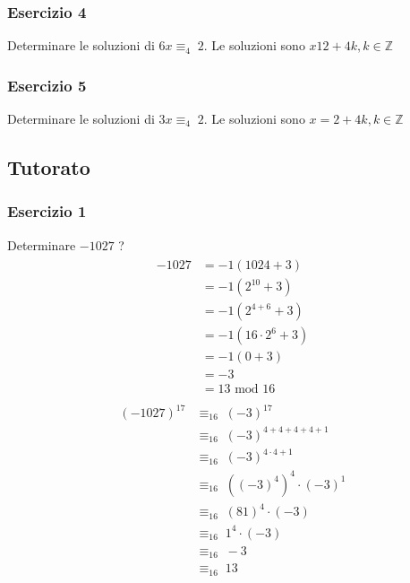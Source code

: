 \documentclass[italian]{article}
\newcommand{\mmod}{\text{ mod }}
\newcommand{\congruente}[1]{\text{$\equiv_{#1}\;$}}
\newcommand{\ins}[1]{\text{$\mathbb{#1}$}}
\begin{document}
\subsubsection{Esercizio 4}
Determinare le soluzioni di $6x \congruente{4} 2$. Le soluzioni sono $x12 + 4k, k\in \ins{Z}$ 

\subsubsection{Esercizio 5}
Determinare le soluzioni di $3x \congruente{4} 2$. Le soluzioni sono $x=2 + 4k, k\in \ins{Z}$ 

\subsection{Tutorato}
\subsubsection{Esercizio 1}
Determinare $-1027$ \congruente{16} ?
\begin{gather*}
	\begin{split}
		-1027 &= -1(1024 + 3)\\
		&= -1(2^{10} + 3) \\
		&= -1(2^{4+6}+3)\\
		&= -1(16\cdot2^{6} + 3) \\
		&= -1(0+3) \\
		&= -3 \\
		& = 13 \mmod 16
	\end{split}
\end{gather*}
\begin{gather*}
	\begin{split}
		(-1027)^{17} &\congruente{16} (-3)^{17} \\
		&\congruente{16} (-3)^{4+4+4+4+1} \\
		&\congruente{16} (-3)^{4\cdot 4 + 1} \\
		&\congruente{16} ((-3)^4)^4 \cdot (-3)^1\\
		&\congruente{16} (81)^4\cdot(-3) \\
		&\congruente{16} 1^4 \cdot (-3) \\
		&\congruente{16} -3 \\
		&\congruente{16} 13
	\end{split}
\end{gather*}
\end{document}
